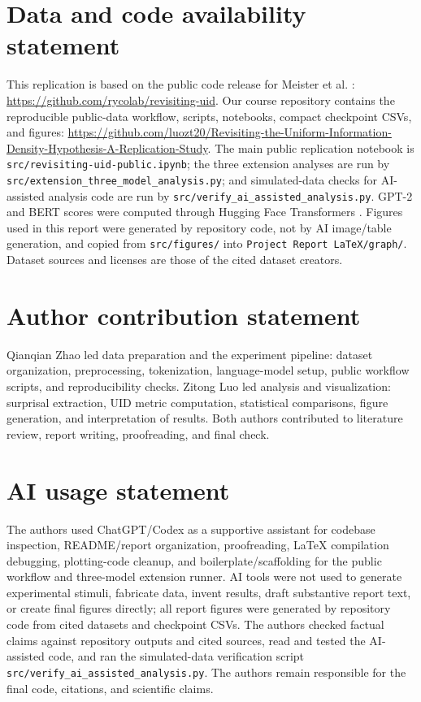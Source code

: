 \documentclass{article}
\begin{document}
\clearpage

\section*{Data and code availability statement}

This replication is based on the public code release for Meister et al. \cite{meister2021}: \url{https://github.com/rycolab/revisiting-uid}. Our course repository contains the reproducible public-data workflow, scripts, notebooks, compact checkpoint CSVs, and figures: \url{https://github.com/luozt20/Revisiting-the-Uniform-Information-Density-Hypothesis-A-Replication-Study}. The main public replication notebook is \texttt{src/revisiting-uid-public.ipynb}; the three extension analyses are run by \texttt{src/extension\_three\_model\_analysis.py}; and simulated-data checks for AI-assisted analysis code are run by \texttt{src/verify\_ai\_assisted\_analysis.py}. GPT-2 and BERT scores were computed through Hugging Face Transformers \cite{wolf2020}. Figures used in this report were generated by repository code, not by AI image/table generation, and copied from \texttt{src/figures/} into \texttt{Project Report LaTeX/graph/}. Dataset sources and licenses are those of the cited dataset creators.

\section*{Author contribution statement}

Qianqian Zhao led data preparation and the experiment pipeline: dataset organization, preprocessing, tokenization, language-model setup, public workflow scripts, and reproducibility checks. Zitong Luo led analysis and visualization: surprisal extraction, UID metric computation, statistical comparisons, figure generation, and interpretation of results. Both authors contributed to literature review, report writing, proofreading, and final check.

\section*{AI usage statement}

The authors used ChatGPT/Codex as a supportive assistant for codebase inspection, README/report organization, proofreading, LaTeX compilation debugging, plotting-code cleanup, and boilerplate/scaffolding for the public workflow and three-model extension runner. AI tools were not used to generate experimental stimuli, fabricate data, invent results, draft substantive report text, or create final figures directly; all report figures were generated by repository code from cited datasets and checkpoint CSVs. The authors checked factual claims against repository outputs and cited sources, read and tested the AI-assisted code, and ran the simulated-data verification script \texttt{src/verify\_ai\_assisted\_analysis.py}. The authors remain responsible for the final code, citations, and scientific claims.
\end{document}
